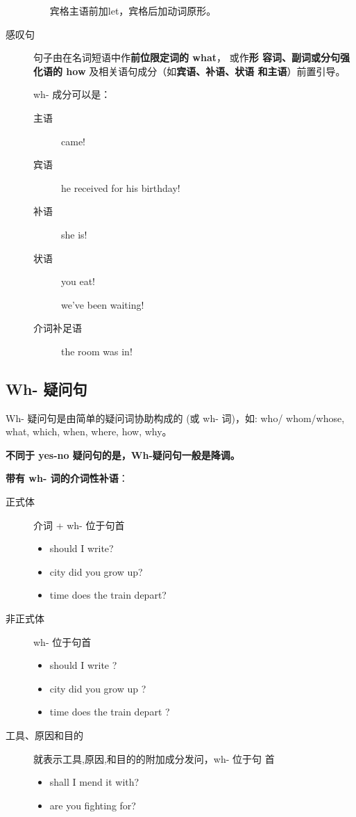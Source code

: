 \begin{description}
\begin{itemize}
    宾格主语前加let，宾格后加动词原形。
  \end{itemize}


\item[感叹句] 句子由在名词短语中作\textbf{前位限定词的 what}， 或作\textbf{形
    容词、副词或分句强化语的 how} 及相关语句成分（如\textbf{宾语、补语、状语
    和主语}）前置引导。

  wh- 成分可以是：
  \begin{description}

  \item[主语]  came!
  \item[宾语]  he received for his birthday!

  \item[补语]  she is!

  \item[状语]  you eat!

     we've been waiting!

  \item[介词补足语]  the room was in!
  \end{description}
\end{description}

\subsection{Wh- 疑问句}

Wh- 疑问句是由简单的疑问词协助构成的 (或 wh- 词)，如: who/ whom/whose,
what, which, when, where, how, why。

\textbf{不同于 yes-no 疑问句的是，Wh-疑问句一般是降调。}

\textbf{带有 wh- 词的介词性补语}：
\begin{description}
\item[正式体]介词 + wh- 位于句首
  \begin{itemize}
  \item {} should I write?
  \item {} city did you grow up?
  \item {} time does the train depart?
  \end{itemize}
\item[非正式体] wh- 位于句首
  \begin{itemize}
  \item {} should I write ?
  \item {} city did you grow up ?
  \item {} time does the train depart ?
  \end{itemize}

\item[工具、原因和目的] 就表示工具,原因,和目的的附加成分发问，wh- 位于句
  首
  \begin{itemize}
  \item {} shall I mend it with?
  \item {} are you fighting for?
  \end{itemize}
\end{description}

